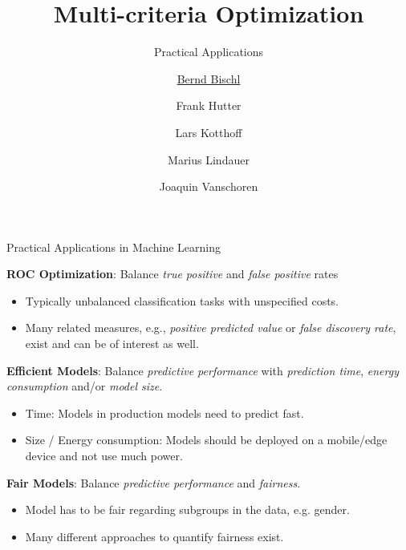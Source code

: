 


\newcommand{\q}[0]{\mathbf{q}}
\newcommand{\Xspace}[0]{\mathcal{X}}
\newcommand{\inducer}{\mathcal{I}}

\title[AutoML: Overview]{Multi-criteria Optimization}
\subtitle{Practical Applications}
\author[Bernd Bischl]{\underline{Bernd Bischl} \and Frank Hutter \and Lars Kotthoff\newline \and Marius Lindauer \and Joaquin Vanschoren}
\institute{}
\date{}






	\maketitle

\begin{frame}[allowframebreaks]{Practical Applications in Machine Learning}

    \textbf{ROC Optimization}: Balance \emph{true positive} and \emph{false positive} rates
  \begin{itemize}
    \item Typically unbalanced classification tasks with unspecified costs.
    \item Many related measures, e.g., \emph{positive predicted value} or \emph{false discovery rate}, exist and can be of interest as well.
  \end{itemize}

\textbf{Efficient Models}:
    Balance \emph{predictive performance} with \emph{prediction time}, \emph{energy consumption} and/or \emph{model size}.
  \begin{itemize}
    \item Time: Models in production models need to predict fast.
    \item Size / Energy consumption: Models should be deployed on a mobile/edge device and not use much power.
  \end{itemize}

\textbf{Fair Models}:
  Balance \emph{predictive performance} and \emph{fairness}.
  \begin{itemize}
    \item Model has to be fair regarding subgroups in the data, e.g. gender.
    \item Many different approaches to quantify fairness exist.
  \end{itemize}

\end{frame}

